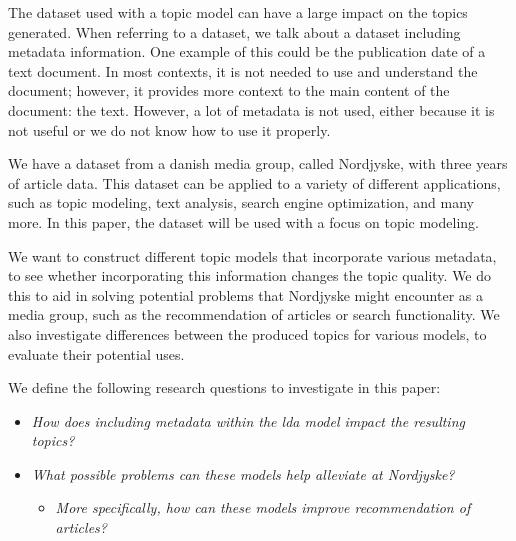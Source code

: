 The dataset used with a topic model can have a large impact on the topics generated.
When referring to a dataset, we talk about a dataset including metadata information.
One example of this could be the publication date of a text document. 
In most contexts, it is not needed to use and understand the document; however, it provides more context to the main content of the document: the text.
However, a lot of metadata is not used, either because it is not useful or we do not know how to use it properly.

We have a dataset from a danish media group, called Nordjyske, with three years of article data.
This dataset can be applied to a variety of different applications, such as topic modeling\cite{blei2003latent}\cite{MetaLDA2017}, text analysis\cite{baly2020written}, search engine optimization\cite{amjad2015topic}, and many more.
In this paper, the dataset will be used with a focus on topic modeling.

We want to construct different topic models that incorporate various metadata, to see whether incorporating this information changes the topic quality.
We do this to aid in solving potential problems that Nordjyske might encounter as a media group, such as the recommendation of articles or search functionality.
We also investigate differences between the produced topics for various models, to evaluate their potential uses.

We define the following research questions to investigate in this paper:

\begin{itemize}
	\item \textit{How does including metadata within the \gls{lda} model impact the resulting topics?}
	\item \textit{What possible problems can these models help alleviate at Nordjyske?}
	\begin{itemize}
		\item \textit{More specifically, how can these models improve recommendation of articles?}
	\end{itemize}
\end{itemize}

